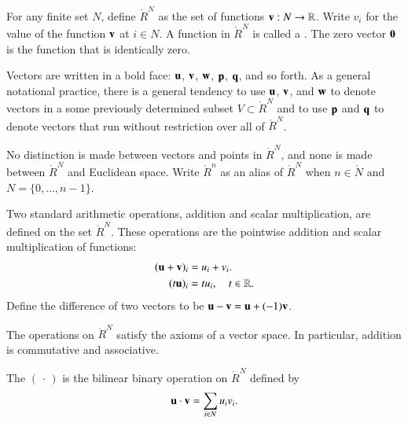 \begin{definition}
  For any finite set $N$, define $\ring{R}^N$ as the set of functions
  ${\mathbf v}:N\to\mathbb{R}$. Write $v_i$ for the value of the function ${\mathbf v}$ at
  $i\in N$.  %
  A function in $\ring{R}^N$ is called a .  The zero
  vector ${\mathbf 0}$ is the function that is identically zero.
\end{definition}
%
Vectors are written in a bold face: ${\mathbf u}$, ${\mathbf v}$, ${\mathbf w}$, ${\mathbf p}$, ${\mathbf q}$, and
so forth.  As a general notational practice, there is a general
tendency to use ${\mathbf u}$, ${\mathbf v}$, and ${\mathbf w}$ to denote vectors in a some
previously determined subset $V\subset \ring{R}^N$ and to use ${\mathbf p}$
and ${\mathbf q}$ to denote vectors that run without restriction over all of
$\ring{R}^N$.

No distinction is made between vectors and points in $\ring{R}^N$, and
none is made between $\ring{R}^N$ and Euclidean space.  Write
$\ring{R}^n$ as an alias of $\ring{R}^N$ when $n\in\ring{N}$ and
$N=\{0,\ldots,n-1\}$.  

\begin{definition} %
  Two standard arithmetic operations, addition and scalar
  multiplication, are defined on the set $\ring{R}^N$.  These
  operations are the pointwise addition and scalar multiplication of
  functions:
\begin{align}
({\mathbf u} + {\mathbf v})_i &= u_i + v_i.\nonumber\\
(t {\mathbf u})_i &= t u_i,\quad t\in\mathbb{R}.
\end{align}
%
%
Define the difference of two vectors to be ${\mathbf u} - {\mathbf v} = {\mathbf u} + (-1) {\mathbf v}$.
%
\end{definition}
The operations on $\ring{R}^N$ 
satisfy the axioms of a vector space. 
In particular, addition is commutative and associative.


\begin{definition}
\label{def:dot}
The   $(\,\cdot\,)$ is the
 bilinear binary operation on $\ring{R}^N$
defined by
\[ 
{\mathbf u}\cdot {\mathbf v} = \sum_{i\in N} u_i v_i.
\] 
%
%
\end{definition}


